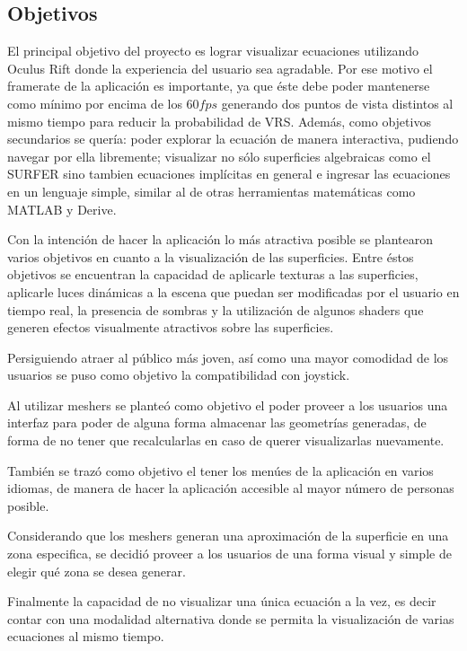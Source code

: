 \documentclass[12pt]{article}
\begin{document}
\subsection{Objetivos}
El principal objetivo del proyecto es lograr visualizar ecuaciones utilizando Oculus Rift donde  la experiencia del usuario sea agradable. Por ese motivo el framerate de la aplicación es importante, ya que éste debe poder mantenerse como mínimo por encima de los $60 fps$ generando dos puntos de vista distintos al mismo tiempo para reducir la probabilidad de VRS. Además, como objetivos secundarios se quería: poder explorar la ecuación de manera interactiva, pudiendo navegar por ella libremente; visualizar no sólo superficies algebraicas como el SURFER sino tambien ecuaciones implícitas en general e ingresar las ecuaciones en un lenguaje simple, similar al de otras herramientas matemáticas como MATLAB y Derive.

Con la intención de hacer la aplicación lo más atractiva posible se plantearon varios objetivos en cuanto a la visualización de las superficies. Entre éstos objetivos se encuentran la capacidad de aplicarle texturas a las superficies, aplicarle luces dinámicas a la escena que puedan ser modificadas por el usuario en tiempo real, la presencia de sombras y la utilización de algunos shaders que generen efectos visualmente atractivos sobre las superficies.

Persiguiendo atraer al público más joven, así como una mayor comodidad de los usuarios se puso como objetivo la compatibilidad con joystick.

Al utilizar meshers se planteó como objetivo el poder proveer a los usuarios una interfaz para poder de alguna forma almacenar las geometrías generadas, de forma de no tener que recalcularlas en caso de querer visualizarlas nuevamente.

También se trazó como objetivo el tener los menúes de la aplicación en varios idiomas, de manera de hacer la aplicación accesible al mayor número de personas posible.

Considerando que los meshers generan una aproximación de la superficie en una zona especifica, se decidió proveer a los usuarios de una forma visual y simple de elegir qué zona se desea generar.

Finalmente la capacidad de no visualizar una única ecuación a la vez, es decir contar con una modalidad alternativa donde se permita la visualización de varias ecuaciones al mismo tiempo.
\end{document}
